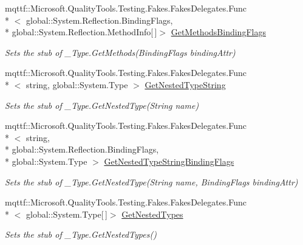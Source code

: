 \begin{DoxyCompactItemize}
mqttf\-::\-Microsoft.\-Quality\-Tools.\-Testing.\-Fakes.\-Fakes\-Delegates.\-Func\\*
$<$ global\-::\-System.\-Reflection.\-Binding\-Flags, \\*
global\-::\-System.\-Reflection.\-Method\-Info\mbox{[}$\,$\mbox{]}$>$ \hyperlink{class_system_1_1_runtime_1_1_interop_services_1_1_fakes_1_1_stub___type_af4016b89ad29bd735f217324605f6ba5}{Get\-Methods\-Binding\-Flags}
\begin{DoxyCompactList}\small\item\em Sets the stub of \-\_\-\-Type.\-Get\-Methods(\-Binding\-Flags binding\-Attr)\end{DoxyCompactList}\item 
mqttf\-::\-Microsoft.\-Quality\-Tools.\-Testing.\-Fakes.\-Fakes\-Delegates.\-Func\\*
$<$ string, global\-::\-System.\-Type $>$ \hyperlink{class_system_1_1_runtime_1_1_interop_services_1_1_fakes_1_1_stub___type_af268199d2fbe3f0540d11de9ed9416a3}{Get\-Nested\-Type\-String}
\begin{DoxyCompactList}\small\item\em Sets the stub of \-\_\-\-Type.\-Get\-Nested\-Type(\-String name)\end{DoxyCompactList}\item 
mqttf\-::\-Microsoft.\-Quality\-Tools.\-Testing.\-Fakes.\-Fakes\-Delegates.\-Func\\*
$<$ string, \\*
global\-::\-System.\-Reflection.\-Binding\-Flags, \\*
global\-::\-System.\-Type $>$ \hyperlink{class_system_1_1_runtime_1_1_interop_services_1_1_fakes_1_1_stub___type_ac5bece8449357eeb5ccc14c76d0fd89a}{Get\-Nested\-Type\-String\-Binding\-Flags}
\begin{DoxyCompactList}\small\item\em Sets the stub of \-\_\-\-Type.\-Get\-Nested\-Type(\-String name, Binding\-Flags binding\-Attr)\end{DoxyCompactList}\item 
mqttf\-::\-Microsoft.\-Quality\-Tools.\-Testing.\-Fakes.\-Fakes\-Delegates.\-Func\\*
$<$ global\-::\-System.\-Type\mbox{[}$\,$\mbox{]}$>$ \hyperlink{class_system_1_1_runtime_1_1_interop_services_1_1_fakes_1_1_stub___type_af8f1cdf1d2775ac8d6aa6e9168677adf}{Get\-Nested\-Types}
\begin{DoxyCompactList}\small\item\em Sets the stub of \-\_\-\-Type.\-Get\-Nested\-Types()\end{DoxyCompactList}\item 

\end{DoxyCompactItemize}

